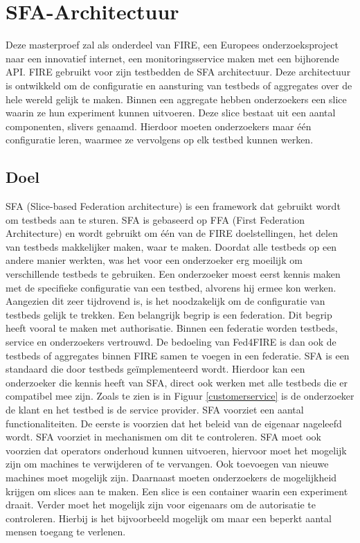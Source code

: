 \chapter{SFA-Architectuur}

{\samenvatting Deze masterproef zal als onderdeel van FIRE, een Europees onderzoeksproject naar een innovatief internet, een monitoringsservice maken met een bijhorende API. FIRE gebruikt voor zijn testbedden de SFA architectuur. Deze architectuur is ontwikkeld om de configuratie en aansturing van testbeds of aggregates over de hele wereld gelijk te maken. Binnen een aggregate hebben onderzoekers een slice waarin ze hun experiment kunnen uitvoeren. Deze slice bestaat uit een aantal componenten, slivers genaamd. Hierdoor moeten onderzoekers maar \'e\'en configuratie leren, waarmee ze vervolgens op elk testbed kunnen werken.}

\section{Doel}
\npar
SFA (Slice-based Federation architecture) is een framework dat gebruikt wordt om testbeds aan te sturen\citep{SFA-overview}. SFA is gebaseerd op FFA (First Federation Architecture) en wordt gebruikt om \'e\'en van de FIRE doelstellingen, het delen van testbeds makkelijker maken, waar te maken. Doordat alle testbeds op een andere manier werkten, was het voor een onderzoeker erg moeilijk om verschillende testbeds te gebruiken. Een onderzoeker moest eerst kennis maken met de specifieke configuratie van een testbed, alvorens hij ermee kon werken. Aangezien dit zeer tijdrovend is, is het noodzakelijk om de configuratie van testbeds gelijk te trekken.
\clearpage
\npar
Een belangrijk begrip is een federation. Dit begrip heeft vooral te maken met authorisatie. Binnen een federatie worden testbeds, service en onderzoekers vertrouwd. De bedoeling van Fed4FIRE is dan ook de testbeds of aggregates binnen FIRE samen te voegen in een federatie.
\npar
SFA is een standaard die door testbeds ge\"implementeerd wordt.
Hierdoor kan een onderzoeker die kennis heeft van SFA, direct ook werken met alle testbeds die er compatibel mee zijn. Zoals te zien is in Figuur \ref{customerservice} is de onderzoeker de klant en het testbed is de service provider.
\npar
SFA voorziet een aantal functionaliteiten. De eerste is voorzien dat het beleid van de eigenaar nageleefd wordt. SFA voorziet in mechanismen om dit te controleren.
\npar
SFA moet ook voorzien dat operators onderhoud kunnen uitvoeren, hiervoor moet het mogelijk zijn om machines te verwijderen of te vervangen. Ook toevoegen van nieuwe machines moet mogelijk zijn. Daarnaast moeten onderzoekers de mogelijkheid krijgen om slices aan te maken. Een slice is een container waarin een experiment draait. 
\npar
Verder moet het mogelijk zijn voor eigenaars om de autorisatie te controleren. Hierbij is het bijvoorbeeld mogelijk om maar een beperkt aantal mensen toegang te verlenen.
\clearpage
